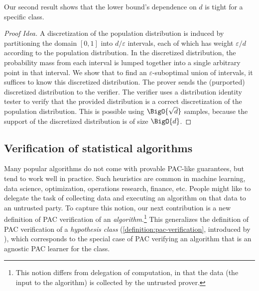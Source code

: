 \documentclass[11pt]{article}
\newtheorem{theorem}{Theorem}[section]
\begin{document}
Our second result shows that the lower bound's dependence on $d$ is tight for a specific class.


\begin{proof}[Proof Idea]
	A discretization of the population distribution is induced by partitioning the domain $[0,1]$ into $d/\varepsilon$ intervals, each of which has weight $\varepsilon/d$ according to the population distribution. In the discretized distribution, the probability mass from each interval is lumped together into a single arbitrary point in that interval. We show that to find an $\varepsilon$-suboptimal union of intervals, it suffices to know this discretized distribution. The prover sends the (purported) discretized distribution to the verifier. The verifier uses a distribution identity tester to verify that the provided distribution is a correct discretization of the population distribution. This is possible using $\BigO{\sqrt{d}}$ samples, because the support of the discretized distribution is of size $\BigO{d}$.
\end{proof} 

\subsection{Verification of statistical algorithms}\label{section:verification-of-statistical-algorithm}

Many popular algorithms do not come with provable PAC-like guarantees, but tend to work well in practice. Such heuristics are common in machine learning, data science, optimization, operations research, finance, etc. People might like to delegate the task of collecting data and executing an algorithm on that data to an untrusted party.
To capture this notion, our next contribution is a new definition of PAC verification of an \emph{algorithm}.\footnote{This notion differs from delegation of computation, in that the data (the input to the algorithm) is collected by the untrusted prover.}
This generalizes the definition of PAC verification of a \emph{hypothesis class} (\cref{definition:pac-verification}, introduced by \cite{GoldwasserRSY21}), which corresponds to the special case of PAC verifying an algorithm that is an agnostic PAC learner for the class.
\end{document}

